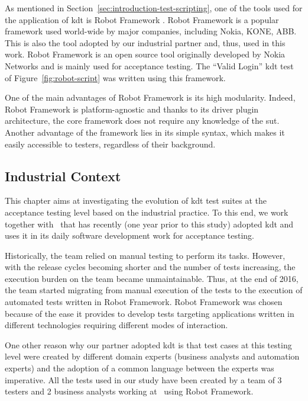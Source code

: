 As mentioned in Section~\ref{sec:introduction-test-scripting}, one of the tools used for the application of \gls{kdt} is Robot Framework \cite{RobotFramework2020}. Robot Framework is a popular framework used world-wide by major companies, including Nokia, KONE, ABB. This is also the tool adopted by our industrial partner and, thus, used in this work. Robot Framework is an open source tool originally developed by Nokia Networks and is mainly used for acceptance testing. The ``Valid Login'' \gls{kdt} test of Figure~\ref{fig:robot-script} was written using this framework.

One of the main advantages of Robot Framework is its high modularity.  Indeed, Robot Framework is platform-agnostic and thanks to its driver plugin architecture, the core framework does not require any knowledge of the \gls{sut}. Another advantage of the framework lies in its simple syntax, which makes it easily accessible to testers, regardless of their background.

\subsection{Industrial Context}
\label{sec:evolution-introduction-data}

This chapter aims at investigating the evolution of \gls{kdt} test suites at the acceptance testing level based on the industrial practice. To this end, we work together with \BGL\ that has recently (one year prior to this study) adopted \gls{kdt} and uses it in its daily software development work for acceptance testing.


Historically, the team relied on manual testing to perform its tasks. However, with the release cycles becoming shorter and the number of tests increasing, the execution burden on the team became unmaintainable. Thus, at the end of 2016, the team started migrating from manual execution of the tests to the execution of automated tests written in Robot Framework. Robot Framework was chosen because of the ease it provides to develop tests targeting applications written in different technologies requiring different modes of interaction.

One other reason why our partner adopted \gls{kdt} is that test cases at this testing level were created by different domain experts (business analysts and automation experts) and the adoption of a common language between the experts was imperative. All the tests used in our study have been created by a team of 3 testers and 2 business analysts working at \BGL\ using Robot Framework.

